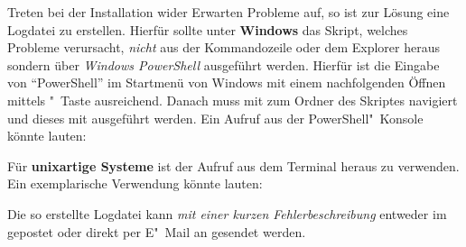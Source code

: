 Treten bei der Installation wider Erwarten Probleme auf, so ist zur Lösung eine 
Logdatei zu erstellen. Hierfür sollte unter \textbf{Windows} das Skript, 
welches Probleme verursacht, \emph{nicht} aus der Kommandozeile oder dem 
Explorer heraus sondern über \emph{Windows PowerShell} ausgeführt werden. 
Hierfür ist die Eingabe von \enquote{PowerShell} im Startmenü von Windows mit 
einem nachfolgenden Öffnen mittels "~Taste ausreichend. 
Danach muss mit  zum Ordner des Skriptes navigiert und dieses mit 
ausgeführt werden. Ein Aufruf aus der PowerShell"~Konsole könnte lauten:
%
\begin{quoting}[rightmargin=0pt]
  \newline%
\end{quoting}
%
Für \textbf{unixartige Systeme} ist der Aufruf 
 aus dem Terminal heraus zu 
verwenden. Ein exemplarische Verwendung könnte lauten:
%
\begin{quoting}
  \newline
\end{quoting}
%
Die so erstellte Logdatei kann \emph{mit einer kurzen Fehlerbeschreibung} 
entweder im \Forum* gepostet oder direkt per E"~Mail an \mailto{\tudscrmail} 
gesendet werden.
%

